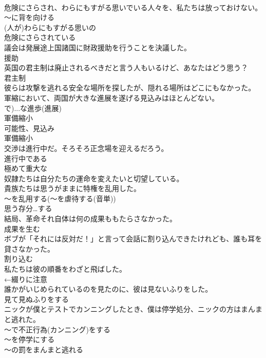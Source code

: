 \documentclass[8pt]{extreport}
\begin{document}
\begin{CJK}{UTF8}{min}
\\	危険にさらされ、わらにもすがる思いでいる人々を、私たちは放っておけない。	
\\	～に背を向ける 
\\	(人が)わらにもすがる思いの 
\\	危険にさらされている
\\	議会は発展途上国諸国に財政援助を行うことを決議した。	
\\	援助
\\	英国の君主制は廃止されるべきだと言う人もいるけど、あなたはどう思う？	
\\	君主制
\\	彼らは攻撃を逃れる安全な場所を探したが、隠れる場所はどこにもなかった。	
\\	軍縮において、両国が大きな進展を遂げる見込みはほとんどない。	
\\	で)...な進歩(進展) 
\\	軍備縮小 
\\	可能性、見込み 
\\	軍備縮小
\\	交渉は進行中だ。そろそろ正念場を迎えるだろう。	
\\	進行中である 
\\	極めて重大な
\\	奴隷たちは自分たちの運命を変えたいと切望している。	
\\	貴族たちは思うがままに特権を乱用した。	
\\	〜を乱用する(～を虐待する(音単)) 
\\	思う存分…する
\\	結局、革命それ自体は何の成果ももたらさなかった。	
\\	成果を生む
\\	ボブが「それには反対だ！」と言って会話に割り込んできたけれども、誰も耳を貸さなかった。	
\\	割り込む
\\	私たちは彼の順番をわざと飛ばした。	
\\	←綴りに注意
\\	誰かがいじめられているのを見たのに、彼は見ないふりをした。	
\\	見て見ぬふりをする
\\	ニックが僕とテストでカンニングしたとき、僕は停学処分、ニックの方はまんまと逃れた。	
\\	～で不正行為(カンニング)をする 
\\	～を停学にする 
\\	～の罰をまんまと逃れる 

\end{CJK}
\end{document}
